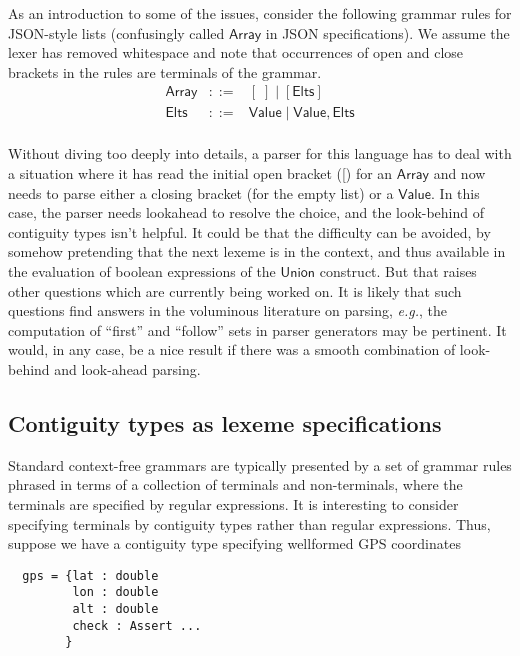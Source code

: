 \documentclass{article}
\newcommand{\eg}{\textit{e.g.}}
\newcommand{\konst}[1]{\ensuremath{\mathsf{#1}}}
\theoremstyle{definition}
\begin{document}
As an introduction to some of the issues, consider the following
grammar rules for JSON-style lists (confusingly called \konst{Array}
in JSON specifications). We assume the lexer has removed whitespace
and note that occurrences of open and close brackets in the rules are
terminals of the grammar.
\[
\begin{array}{rcl}
 \konst{Array} & ::= & [\; ] \mid [ \konst{Elts} ] \\
 \konst{Elts}  & ::= & \konst{Value} \mid \konst{Value} ,  \konst{Elts} \\
\end{array}
\]

Without diving too deeply into details, a parser for this language has
to deal with a situation where it has read the initial open bracket
([) for an \konst{Array} and now needs to parse either a closing
  bracket (for the empty list) or a \konst{Value}. In this case, the
  parser needs lookahead to resolve the choice, and the look-behind of
  contiguity types isn't helpful. It could be that the difficulty can
  be avoided, by somehow pretending that the next lexeme is in the
  context, and thus available in the evaluation of boolean expressions
  of the \konst{Union} construct. But that raises other questions
  which are currently being worked on. It is likely that such
  questions find answers in the voluminous literature on parsing, \eg,
  the computation of ``first'' and ``follow'' sets in parser
  generators may be pertinent. It would, in any case, be a nice result
  if there was a smooth combination of look-behind and look-ahead
  parsing.

\subsection{Contiguity types as lexeme specifications}

Standard context-free grammars are typically presented by a set of
grammar rules phrased in terms of a collection of terminals and
non-terminals, where the terminals are specified by regular
expressions. It is interesting to consider specifying terminals by
contiguity types rather than regular expressions. Thus, suppose we
have a contiguity type specifying wellformed GPS coordinates

{\small
\begin{verbatim}
  gps = {lat : double
         lon : double
         alt : double
         check : Assert ...
        }
\end{verbatim}}
\end{document}
